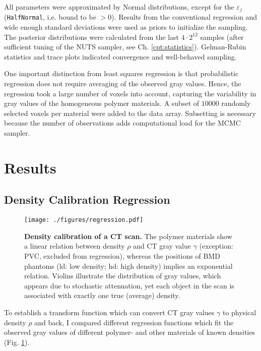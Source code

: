 All parameters were approximated by Normal distributions, except for the \(\varepsilon_{j}\) (\texttt{HalfNormal}, i.e. bound to be \(>0\)).
Results from the conventional regression and wide enough standard deviations were used as priors to initialize the sampling.
The posterior distributions were calculated from the last \(4\cdot 2^{12}\) samples (after sufficient tuning of the NUTS sampler, see Ch. \ref{cpt:statistics}).
Gelman-Rubin statistics and trace plots indicated convergence and well-behaved sampling.


One important distinction from least squares regression is that probabilistic regression does not require averaging of the observed gray values.
Hence, the regression took a large number of voxels into account, capturing the variability in gray values of the homogeneous polymer materials.
A subset of \(10000\) randomly selected voxels per material were added to the data array.
Subsetting is necessary because the number of observations adds computational load for the MCMC sampler.


\clearpage
\section{Results}
\label{sec:orga96f0d5}
\subsection{Density Calibration Regression}
\label{sec:org8ec3a6a}
\begin{figure}[p]
\centering
\texttt{[image: ./figures/regression.pdf]}
\caption{\label{fig:density_calibration}\textbf{Density calibration of a CT scan.} The polymer materials show a linear relation between density \(\rho\) and CT gray value \(\gamma\) (exception: PVC, excluded from regression), whereas the positions of BMD phantoms (ld: low density; hd: high density) implies an exponential relation. Violins illustrate the distribution of gray values, which appears due to stochastic attenuation, yet each object in the scan is associated with exactly one true (average) density.}
\end{figure}

To establish a transform function which can convert CT gray values \(\gamma\) to physical density \(\rho\) and back, I compared different regression functions which fit the observed gray values of different polymer- and other materials of known densities (Fig. \ref{fig:density_calibration}).

